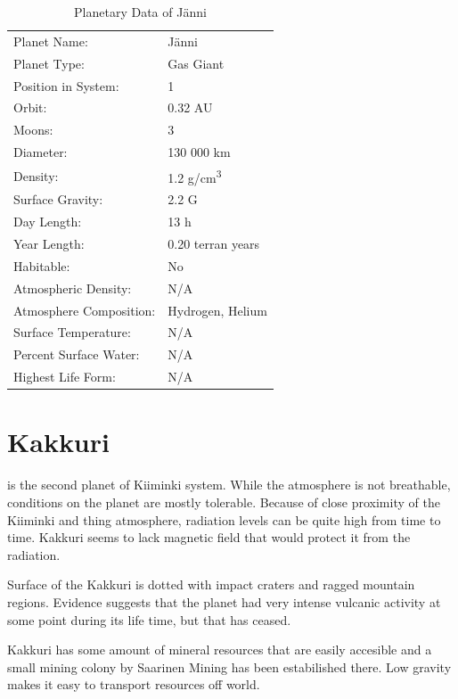 \documentclass{tufte-book}
\begin{document}
\bigskip
\begin{table}
\begin{minipage}{\textwidth}
\begin{center}
\begin{tabular}{ll}
\toprule
Planet Name: & J\"{a}nni \\
Planet Type: & Gas Giant \\
Position in System: & 1 \\
Orbit: & 0.32 AU \\
Moons: & 3 \\
Diameter: & 130 000 km \\
Density: & 1.2 g/cm\textsuperscript{3} \\
Surface Gravity: & 2.2 G \\
Day Length: & 13 h \\
Year Length: & 0.20 terran years \\
Habitable: & No \\
\quad Atmospheric Density: & N/A \\
\quad Atmosphere Composition: & Hydrogen, Helium \\
\quad Surface Temperature: & N/A \\
\quad Percent Surface Water: & N/A \\
\quad Highest Life Form: & N/A \\

\bottomrule
\end{tabular}
\end{center}
\end{minipage}
\caption{Planetary Data of J\"{a}nni}
\end{table}

\section{Kakkuri}

 is the second planet of Kiiminki system. While the
atmosphere is not breathable, conditions on the planet are mostly tolerable.
Because of close proximity of the Kiiminki and thing atmosphere, radiation
levels can be quite high from time to time. Kakkuri seems to lack magnetic
field that would protect it from the radiation.

Surface of the Kakkuri is dotted with impact craters and ragged mountain
regions. Evidence suggests that the planet had very intense vulcanic activity
at some point during its life time, but that has ceased.

Kakkuri has some amount of mineral resources that are easily accesible and a
small mining colony by Saarinen Mining has been estabilished there.
Low gravity makes it easy to transport resources off world.
\end{document}
